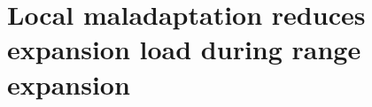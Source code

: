 \chapter{Local maladaptation reduces expansion load during range expansion}
\label{chap:expansionload}





